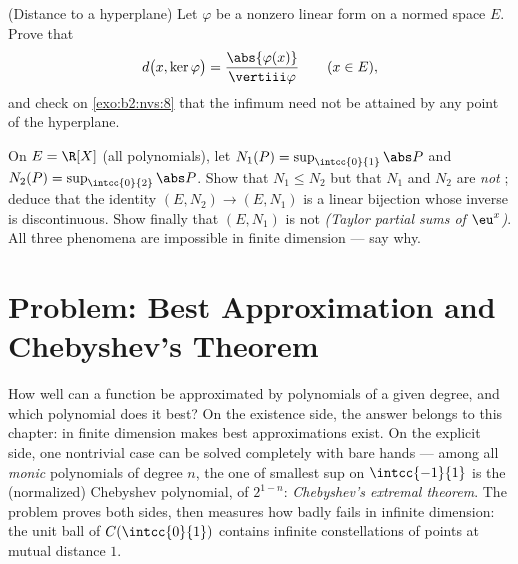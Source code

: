 \begin{exercise}[$\star\star$]\label{exo:b2:nvs:11}
(Distance to a hyperplane) Let $\varphi$ be a nonzero 
linear form on a normed space $E$. Prove that
\[
d\bigl(x, \ker\varphi\bigr) =
\frac{\abs{\varphi(x)}}{\vertiii\varphi}
\qquad (x \in E),
\]
and check on \cref{exo:b2:nvs:8} that the infimum need not be
attained by any point of the hyperplane.
\end{exercise}

\begin{exercise}[$\star\star\star$]\label{exo:b2:nvs:12}
On $E = \R[X]$ (all polynomials), let $N_1(P) =
\sup_{\intcc{0}{1}}\abs P$ and $N_2(P) =
\sup_{\intcc{0}{2}}\abs P$. Show that $N_1 \leq N_2$ but that
$N_1$ and $N_2$ are \emph{not} ; deduce that the
identity $(E, N_2) \to (E, N_1)$ is a  linear bijection
whose inverse is discontinuous. Show finally that $(E, N_1)$ is
not  \emph{(Taylor partial sums of $\eu^x$)}. All three
phenomena are impossible in finite dimension --- say why.
\end{exercise}

\section{Problem: Best Approximation and Chebyshev's Theorem}

How well can a function be approximated by polynomials of a given
degree, and which polynomial does it best? On the existence side,
the answer belongs to this chapter:  in finite
dimension makes best approximations exist. On the explicit side,
one nontrivial case can be solved completely with bare hands ---
among all \emph{monic} polynomials of degree $n$, the one of
smallest sup  on $\intcc{-1}{1}$ is the (normalized) Chebyshev
polynomial, of  $2^{1-n}$: \emph{Chebyshev's extremal
theorem}. The problem proves both sides, then measures how badly
 fails in infinite dimension: the unit ball of
$C(\intcc{0}{1})$ contains infinite constellations of points at
mutual distance $1$.

